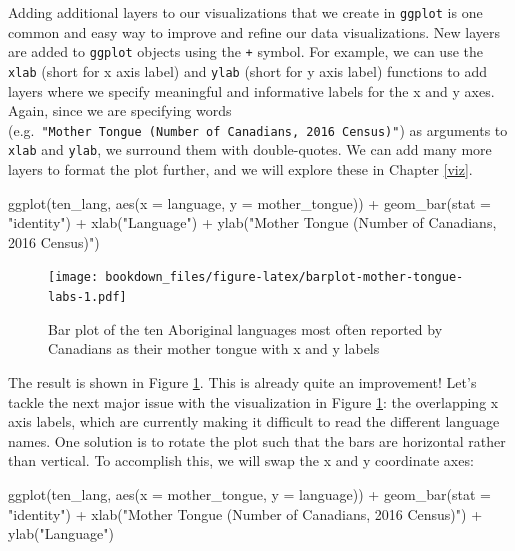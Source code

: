\documentclass[
]{book}
\newenvironment{Shaded}{\begin{snugshade}}{\end{snugshade}}
\newcommand{\AttributeTok}[1]{\textcolor[rgb]{0.61,0.61,0.61}{#1}}
\newcommand{\FunctionTok}[1]{\textcolor[rgb]{0,0,0}{#1}}
\newcommand{\NormalTok}[1]{#1}
\newcommand{\SpecialCharTok}[1]{\textcolor[rgb]{0,0,0}{#1}}
\newcommand{\StringTok}[1]{\textcolor[rgb]{0.5,0.5,0.5}{#1}}
\begin{document}
Adding additional layers  to our visualizations that we create in \texttt{ggplot} is
one common and easy way to improve and refine our data visualizations. New
layers are added to \texttt{ggplot} objects using the \texttt{+} symbol. For example, we can
use the \texttt{xlab} (short for x axis label) and \texttt{ylab} (short for y axis label) functions
to add layers where we specify meaningful
and informative labels for the x and y axes.  Again, since we are specifying
words (e.g.~\texttt{"Mother\ Tongue\ (Number\ of\ Canadians,\ 2016\ Census)"}) as arguments to
\texttt{xlab} and \texttt{ylab}, we surround them with double-quotes. We can add many more
layers to format the plot further, and we will explore these in Chapter
\ref{viz}.

\begin{Shaded}
\begin{Highlighting}[]
\FunctionTok{ggplot}\NormalTok{(ten\_lang, }\FunctionTok{aes}\NormalTok{(}\AttributeTok{x =}\NormalTok{ language, }\AttributeTok{y =}\NormalTok{ mother\_tongue)) }\SpecialCharTok{+}
  \FunctionTok{geom\_bar}\NormalTok{(}\AttributeTok{stat =} \StringTok{"identity"}\NormalTok{) }\SpecialCharTok{+}
  \FunctionTok{xlab}\NormalTok{(}\StringTok{"Language"}\NormalTok{) }\SpecialCharTok{+}
  \FunctionTok{ylab}\NormalTok{(}\StringTok{"Mother Tongue (Number of Canadians, 2016 Census)"}\NormalTok{)}
\end{Highlighting}
\end{Shaded}

\begin{figure}
\centering
\texttt{[image: bookdown\_files/figure-latex/barplot-mother-tongue-labs-1.pdf]}
\caption{\label{fig:barplot-mother-tongue-labs}Bar plot of the ten Aboriginal languages most often reported by Canadians as their mother tongue with x and y labels}
\end{figure}

The result is shown in Figure \ref{fig:barplot-mother-tongue-labs}.
This is already quite an improvement! Let's tackle the next major issue with the visualization
in Figure \ref{fig:barplot-mother-tongue-labs}: the overlapping x axis labels, which are
currently making it difficult to read the different language names.
One solution is to rotate the plot such that the bars are horizontal rather than vertical.
To accomplish this, we will swap the x and y coordinate axes:

\begin{Shaded}
\begin{Highlighting}[]
\FunctionTok{ggplot}\NormalTok{(ten\_lang, }\FunctionTok{aes}\NormalTok{(}\AttributeTok{x =}\NormalTok{ mother\_tongue, }\AttributeTok{y =}\NormalTok{ language)) }\SpecialCharTok{+}
  \FunctionTok{geom\_bar}\NormalTok{(}\AttributeTok{stat =} \StringTok{"identity"}\NormalTok{) }\SpecialCharTok{+}
  \FunctionTok{xlab}\NormalTok{(}\StringTok{"Mother Tongue (Number of Canadians, 2016 Census)"}\NormalTok{) }\SpecialCharTok{+}
  \FunctionTok{ylab}\NormalTok{(}\StringTok{"Language"}\NormalTok{) }
\end{Highlighting}
\end{Shaded}
\end{document}
